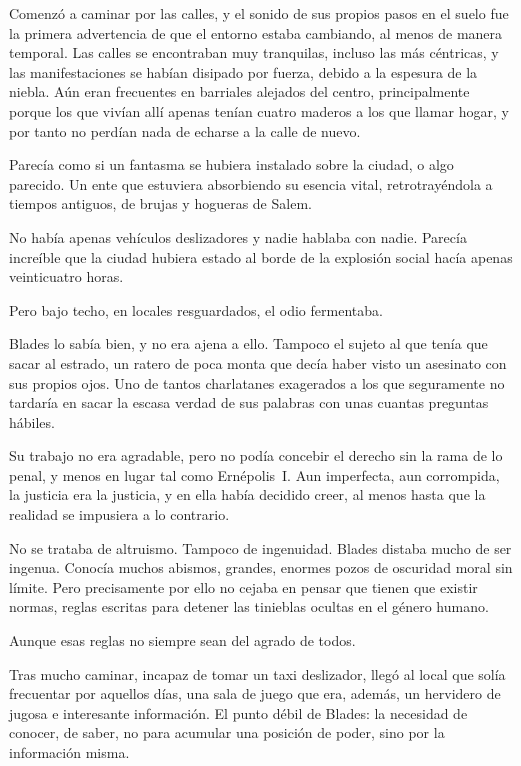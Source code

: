 Comenzó a caminar por las calles, y el sonido de sus propios pasos en el suelo fue la primera advertencia de que el entorno estaba cambiando, al menos de manera temporal. Las calles se encontraban muy tranquilas, incluso las más céntricas, y las manifestaciones se habían disipado por fuerza, debido a la espesura de la niebla. Aún eran frecuentes en barriales alejados del centro, principalmente porque los que vivían allí apenas tenían cuatro maderos a los que llamar hogar, y por tanto no perdían nada de echarse a la calle de nuevo.

Parecía como si un fantasma se hubiera instalado sobre la ciudad, o algo parecido. Un ente que estuviera absorbiendo su esencia vital, retrotrayéndola a tiempos antiguos, de brujas y hogueras de Salem.

No había apenas vehículos deslizadores y nadie hablaba con nadie. Parecía increíble que la ciudad hubiera estado al borde de la explosión social hacía apenas veinticuatro horas.

Pero bajo techo, en locales resguardados, el odio fermentaba.

Blades lo sabía bien, y no era ajena a ello. Tampoco el sujeto al que tenía que sacar al estrado, un ratero de poca monta que decía haber visto un asesinato con sus propios ojos. Uno de tantos charlatanes exagerados a los que seguramente no tardaría en sacar la escasa verdad de sus palabras con unas cuantas preguntas hábiles.

Su trabajo no era agradable, pero no podía concebir el derecho sin la rama de lo penal, y menos en lugar tal como Ernépolis~I. Aun imperfecta, aun corrompida, la justicia era la justicia, y en ella había decidido creer, al menos hasta que la realidad se impusiera a lo contrario.

No se trataba de altruismo. Tampoco de ingenuidad. Blades distaba mucho de ser ingenua. Conocía muchos abismos, grandes, enormes pozos de oscuridad moral sin límite. Pero precisamente por ello no cejaba en pensar que tienen que existir normas, reglas escritas para detener las tinieblas ocultas en el género humano.

Aunque esas reglas no siempre sean del agrado de todos.

Tras mucho caminar, incapaz de tomar un taxi deslizador, llegó al local que solía frecuentar por aquellos días, una sala de juego que era, además, un hervidero de jugosa e interesante información. El punto débil de Blades: la necesidad de conocer, de saber, no para acumular una posición de poder, sino por la información misma.

